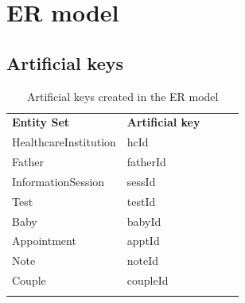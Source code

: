 \documentclass[10pt, letterpaper]{article}
\begin{document}
\section*{ER model}
\subsection*{Artificial keys}
\begin{table}[h]
    \begin{center}
        \begin{tabular}{lllll}
            \cline{1-2}
            \multicolumn{1}{|l|}{\textbf{Entity Set}}   & \multicolumn{1}{l|}{\textbf{Artificial key}} &  &  & \\ \cline{1-2}
            \multicolumn{1}{|l|}{HealthcareInstitution} & \multicolumn{1}{l|}{hcId}                    &  &  & \\ \cline{1-2}
            \multicolumn{1}{|l|}{Father}                & \multicolumn{1}{l|}{fatherId}                &  &  & \\ \cline{1-2}
            \multicolumn{1}{|l|}{InformationSession}    & \multicolumn{1}{l|}{sessId}                  &  &  & \\ \cline{1-2}
            \multicolumn{1}{|l|}{Test}                  & \multicolumn{1}{l|}{testId}                  &  &  & \\ \cline{1-2}
            \multicolumn{1}{|l|}{Baby}                  & \multicolumn{1}{l|}{babyId}                  &  &  & \\ \cline{1-2}
            \multicolumn{1}{|l|}{Appointment}           & \multicolumn{1}{l|}{apptId}                  &  &  & \\ \cline{1-2}
            \multicolumn{1}{|l|}{Note}                  & \multicolumn{1}{l|}{noteId}                  &  &  & \\ \cline{1-2}
            \multicolumn{1}{|l|}{Couple}                & \multicolumn{1}{l|}{coupleId}                &  &  & \\ \cline{1-2}



                                                        &                                              &  &  &
        \end{tabular}
    \end{center}
    \caption{Artificial keys created in the ER model}
\end{table}
\end{document}
